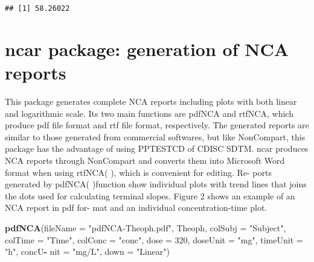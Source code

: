 \documentclass[12pt,]{krantz}
\newenvironment{Shaded}{\begin{snugshade}}{\end{snugshade}}
\newcommand{\KeywordTok}[1]{\textcolor[rgb]{0.13,0.29,0.53}{\textbf{#1}}}
\newcommand{\DataTypeTok}[1]{\textcolor[rgb]{0.13,0.29,0.53}{#1}}
\newcommand{\DecValTok}[1]{\textcolor[rgb]{0.00,0.00,0.81}{#1}}
\newcommand{\FloatTok}[1]{\textcolor[rgb]{0.00,0.00,0.81}{#1}}
\newcommand{\StringTok}[1]{\textcolor[rgb]{0.31,0.60,0.02}{#1}}
\newcommand{\OperatorTok}[1]{\textcolor[rgb]{0.81,0.36,0.00}{\textbf{#1}}}
\newcommand{\NormalTok}[1]{#1}
\theoremstyle{definition}
\theoremstyle{definition}
\theoremstyle{definition}
\theoremstyle{remark}
\begin{document}
\begin{Shaded}
\end{Shaded}

\begin{verbatim}
## [1] 58.26022
\end{verbatim}

\section{ncar package: generation of NCA
reports}\label{ncar-package-generation-of-nca-reports}

This package generates complete NCA reports including plots with both
linear and logarithmic scale. Its two main functions are pdfNCA and
rtfNCA, which produce pdf file format and rtf file format, respectively.
The generated reports are similar to those generated from commercial
softwares, but like NonCompart, this package has the advantage of using
PPTESTCD of CDISC SDTM. ncar produces NCA reports through NonCompart and
converts them into Microsoft Word format when using rtfNCA( ), which is
convenient for editing. Re- ports generated by pdfNCA( )function show
individual plots with trend lines that joins the dots used for
calculating terminal slopes. Figure 2 shows an example of an NCA report
in pdf for- mat and an individual concentration-time plot.

\begin{Shaded}
\begin{Highlighting}[]
\KeywordTok{pdfNCA}\NormalTok{(}\DataTypeTok{fileName =} \StringTok{"pdfNCA-Theoph.pdf"}\NormalTok{,}
\NormalTok{Theoph, }\DataTypeTok{colSubj =} \StringTok{"Subject"}\NormalTok{, }\DataTypeTok{colTime =}
\StringTok{"Time"}\NormalTok{, }\DataTypeTok{colConc =} \StringTok{"conc"}\NormalTok{, }\DataTypeTok{dose =} \DecValTok{320}\NormalTok{,}
\DataTypeTok{doseUnit =} \StringTok{"mg"}\NormalTok{, }\DataTypeTok{timeUnit =} \StringTok{"h"}\NormalTok{, concU}\OperatorTok{-}
\DataTypeTok{nit =} \StringTok{"mg/L"}\NormalTok{, }\DataTypeTok{down =} \StringTok{"Linear"}\NormalTok{)}
\end{Highlighting}
\end{Shaded}
\end{document}
